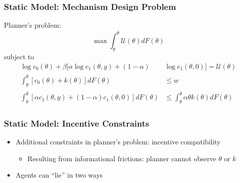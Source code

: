 \documentclass{beamer}
\begin{document}
\begin{frame}
    \frametitle{Static Model: Mechanism Design Problem}

    Planner's problem:
    \begin{equation*}
        \max\int_{\underline{\theta}}^{\overline{\theta}}\mathcal{U}\left(\theta\right)dF\left(\theta\right)
    \end{equation*}
    subject to
    \begin{align*}
        \log c_{0}\left(\theta\right)+\beta[\alpha\log c_{1}\left(\theta,y\right)+\left(1-\alpha\right)&\log c_{1}\left(\theta,0\right)]=\mathcal{U}\left(\theta\right)\\
        \int_{\underline{\theta}}^{\overline{\theta}}\left[c_{0}\left(\theta\right)+k\left(\theta\right)\right]dF\left(\theta\right)&\le w\\
        \int_{\underline{\theta}}^{\overline{\theta}}\left[\alpha c_{1}\left(\theta,y\right)+\left(1-\alpha\right)c_{1}\left(\theta,0\right)\right]dF\left(\theta\right)&\le\int_{\underline{\theta}}^{\overline{\theta}}\alpha\theta k\left(\theta\right)dF\left(\theta\right)
    \end{align*}

\end{frame}

\begin{frame}
    \frametitle{Static Model: Incentive Constraints}

    \begin{itemize}
        \item Additional constraints in planner's problem: incentive compatibility 
        \begin{itemize}
            \item Resulting from informational frictions: planner cannot observe \( \theta \) or \( k \)
        \end{itemize}
        \item Agents can ``lie'' in two ways
    \end{itemize}

\end{frame}
\end{document}
